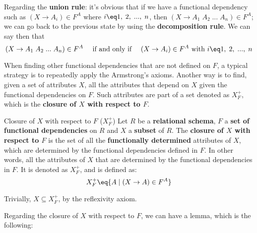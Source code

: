Regarding the \textbf{union rule}: it's obvious that if we have a functional dependency such as $(X \rightarrow A_i) \in F^A$ where $i \eq 1, \; 2, \; ..., \; n$, then $(X \rightarrow A_1 \; A_2 \; ... \; A_n) \in F^A$; we can go back to the previous state by using the \textbf{decomposition rule}. We can say then that
\[ (X \rightarrow A_1 \; A_2 \; ... \; A_n) \in F^A \quad \text{ if and only if } \quad (X \rightarrow A_i) \in F^A \text{ with } i \eq 1, \; 2, \; ..., \; n \]

When finding other functional dependencies that are not defined on $F$, a typical strategy is to repeatedly apply the Armstrong's axioms. Another way is to find, given a set of attributes $X$, all the attributes that depend on $X$ given the functional dependencies on $F$. Such attributes are part of a set denoted as $X^+_F$, which is the \textbf{closure of $X$ with respect to $F$}.

\begin{definition}{Closure of $X$ with respect to $F$ ($X^+_F$)}
    Let $R$ be a \textbf{relational schema}, $F$ a \textbf{set of functional dependencies} on $R$ and $X$ a \textbf{subset} of $R$. The \textbf{closure of $X$ with respect to $F$} is the set of all the \textbf{functionally determined} attributes of $X$, which are determined by the functional dependencies defined in $F$. In other words, all the attributes of $X$ that are determined by the functional dependencies in $F$. It is denoted as $X^+_F$, and is defined as:
    \[ X^+_F \eq \{ A \; | \; (X \rightarrow A) \in F^A \} \]

    Trivially, $X \subseteq X^+_F$, by the reflexivity axiom.
\end{definition}


Regarding the closure of $X$ with respect to $F$, we can have a lemma, which is the following:

